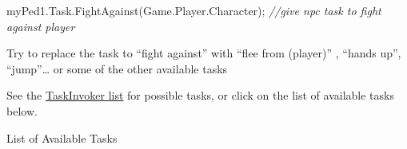 \documentclass[
  openany]{book}
\newenvironment{Shaded}{\begin{snugshade}}{\end{snugshade}}
\newcommand{\CommentTok}[1]{\textcolor[rgb]{0.56,0.35,0.01}{\textit{#1}}}
\newcommand{\FunctionTok}[1]{\textcolor[rgb]{0.00,0.00,0.00}{#1}}
\newcommand{\NormalTok}[1]{#1}
\begin{document}
\begin{Shaded}
\begin{Highlighting}[]
\NormalTok{myPed1.}\FunctionTok{Task}\NormalTok{.}\FunctionTok{FightAgainst}\NormalTok{(Game.}\FunctionTok{Player}\NormalTok{.}\FunctionTok{Character}\NormalTok{); }\CommentTok{//give npc task to fight against player}
\end{Highlighting}
\end{Shaded}

Try to replace the task to ``fight against'' with ``flee from (player)'' , ``hands up'', ``jump''\ldots{} or some of the other available tasks

See the \href{https://nitanmarcel.github.io/shvdn-docs.github.io/class_g_t_a_1_1_task_invoker.html}{TaskInvoker list} for possible tasks, or click on the list of available tasks below.

List of Available Tasks
\end{document}
